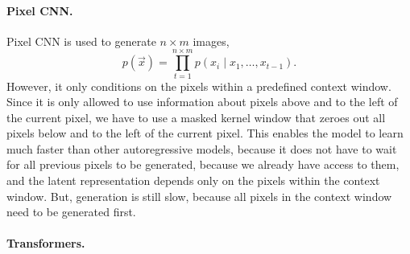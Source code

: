 \paragraph{Pixel CNN.}

Pixel CNN is used to generate $n \times m$ images, \[
    p(\vec{x}) = \prod_{t=1}^{n\times m} p(x_i \mid x_1, \ldots, x_{t-1}).
\]
However, it only conditions on the pixels within a predefined context window. Since it is only
allowed to use information about pixels above and to the left of the current pixel, we have to use
a masked kernel window that zeroes out all pixels below and to the left of the current pixel. This
enables the model to learn much faster than other autoregressive models, because it does not have
to wait for all previous pixels to be generated, because we already have access to them, and the
latent representation depends only on the pixels within the context window. But, generation is
still slow, because all pixels in the context window need to be generated first.

\paragraph{Transformers.}


